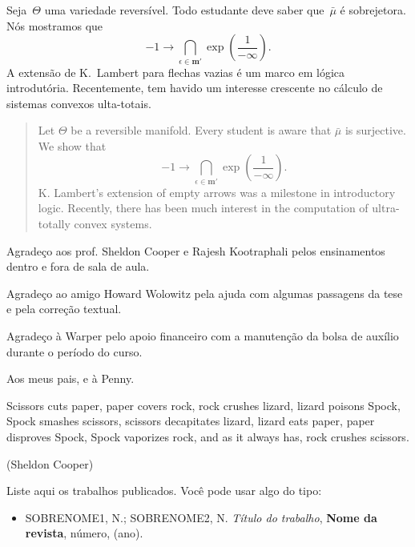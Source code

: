\documentclass[final]{ufc}
\theoremstyle{plain}
\theoremstyle{definition}
\begin{document}
\maketitle
\begin{resumo}
Seja~$\Theta$ uma variedade reversível. Todo estudante deve saber que~$\bar{\mu}$ é sobrejetora. Nós mostramos que $$-1 \to \bigcap_{\epsilon \in \mathbf{{m}}'}  \exp \left( \frac{1}{-\infty} \right).$$  A extensão de K.~Lambert para flechas vazias é um marco em lógica introdutória. Recentemente, tem havido um interesse crescente no cálculo de sistemas convexos ulta-totais.
\end{resumo}

\begin{abstract}
 Let $\Theta$ be a reversible manifold.  Every student is aware that $\bar{\mu}$ is surjective.  We show that $$-1 \to \bigcap_{\epsilon \in \mathbf{{m}}'}  \exp \left( \frac{1}{-\infty} \right).$$  K. Lambert's extension of empty arrows was a milestone in introductory logic. Recently, there has been much interest in the computation of ultra-totally convex systems.
\end{abstract}

\begin{agradecimentos}
Agradeço aos prof. Sheldon Cooper e Rajesh Kootraphali pelos ensinamentos dentro e fora de sala de aula.

Agradeço ao amigo Howard Wolowitz pela ajuda com algumas passagens da tese e pela correção textual.

Agradeço à Warper pelo apoio financeiro com a manutenção da bolsa de auxílio durante o período do curso.
\end{agradecimentos}

\begin{dedicatoria}
Aos meus pais, e à Penny.
\end{dedicatoria}

\begin{epigrafe}
Scissors cuts paper, paper covers rock, rock crushes lizard, lizard poisons Spock, Spock smashes scissors, scissors decapitates lizard, lizard eats paper, paper disproves Spock, Spock vaporizes rock, and as it always has, rock crushes scissors.\par\textnormal{(Sheldon Cooper)}
\end{epigrafe}

\tableofcontents

\begin{listapublicacoes}
  Liste aqui os trabalhos publicados. Você pode usar algo do tipo:
  \begin{itemize}
    \item SOBRENOME1, N.; SOBRENOME2, N. \emph{Título do trabalho}, \textbf{Nome da revista}, número, (ano). 
  \end{itemize}
\end{listapublicacoes}
\end{document}
